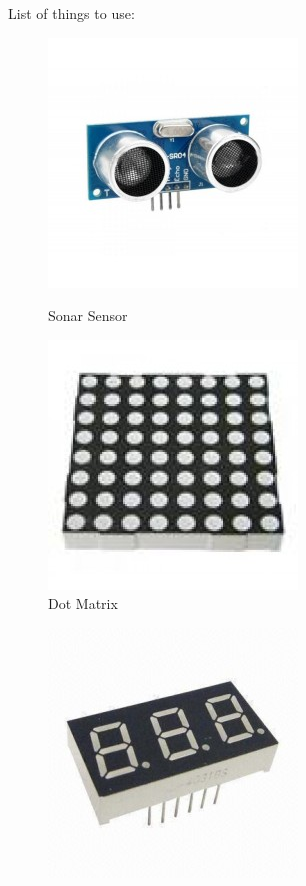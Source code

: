 \documentclass[15pt]{beamer}
\begin{document}
\begin{frame}
List of things to use:

\begin{figure}[!tbp]
  \centering
  \begin{minipage}[b]{0.4\textwidth}
    \includegraphics[width=.5\textwidth]{sonar_sensor.jpg}
    \caption{Sonar Sensor}
  \end{minipage}
  \hfill
  \begin{minipage}[b]{0.4\textwidth}
    \includegraphics[width=.5\textwidth]{dot_matrix.jpg}
    \caption{Dot Matrix}
  \end{minipage}
  \end{figure}
  \begin{figure}
    \centering
  \begin{minipage}[b]{0.4\textwidth}
    \includegraphics[width=.5\textwidth]{seven_segment.jpg}

\end{minipage}
\end{figure}
\end{frame}
\end{document}
